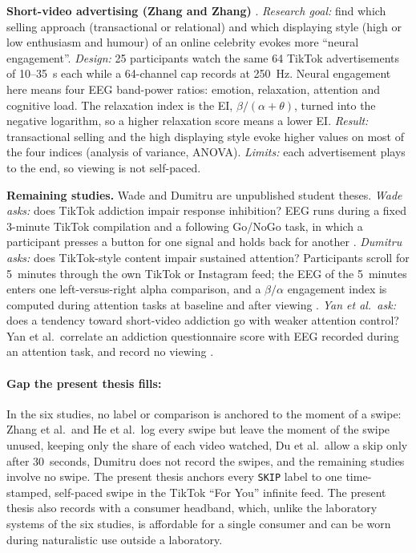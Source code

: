 \documentclass[12pt,a4paper]{report}
\begin{document}
\textbf{Short-video advertising (Zhang and Zhang)} \cite{zhang_how_2025-1}. \emph{Research goal:} find which selling approach (transactional or relational) and which displaying style (high or low enthusiasm and humour) of an online celebrity evokes more ``neural engagement''. \emph{Design:} 25 participants watch the same 64 TikTok advertisements of 10--35~s each while a 64-channel cap records at 250~Hz. Neural engagement here means four EEG band-power ratios: emotion, relaxation, attention and cognitive load. The relaxation index is the EI, $\beta/(\alpha+\theta)$, turned into the negative logarithm, so a higher relaxation score means a lower EI. \emph{Result:} transactional selling and the high displaying style evoke higher values on most of the four indices (analysis of variance, ANOVA). \emph{Limits:} each advertisement plays to the end, so viewing is not self-paced.

\textbf{Remaining studies.} Wade and Dumitru are unpublished student theses. \emph{Wade asks:} does TikTok addiction impair response inhibition? EEG runs during a fixed 3-minute TikTok compilation and a following Go/NoGo task, in which a participant presses a button for one signal and holds back for another \cite{wade_investigating_2024}. \emph{Dumitru asks:} does TikTok-style content impair sustained attention? Participants scroll for 5~minutes through the own TikTok or Instagram feed; the EEG of the 5~minutes enters one left-versus-right alpha comparison, and a $\beta/\alpha$ engagement index is computed during attention tasks at baseline and after viewing \cite{dumitru_does_2025}. \emph{Yan et al.\ ask:} does a tendency toward short-video addiction go with weaker attention control? Yan et al.\ correlate an addiction questionnaire score with EEG recorded during an attention task, and record no viewing \cite{yan_mobile_2024}.

\paragraph{Gap the present thesis fills:} In the six studies, no label or comparison is anchored to the moment of a swipe: Zhang et al.\ and He et al.\ log every swipe but leave the moment of the swipe unused, keeping only the share of each video watched, Du et al.\ allow a skip only after 30~seconds, Dumitru does not record the swipes, and the remaining studies involve no swipe. The present thesis anchors every \texttt{SKIP} label to one time-stamped, self-paced swipe in the TikTok ``For You'' infinite feed. The present thesis also records with a consumer headband, which, unlike the laboratory systems of the six studies, is affordable for a single consumer and can be worn during naturalistic use outside a laboratory.
\end{document}
